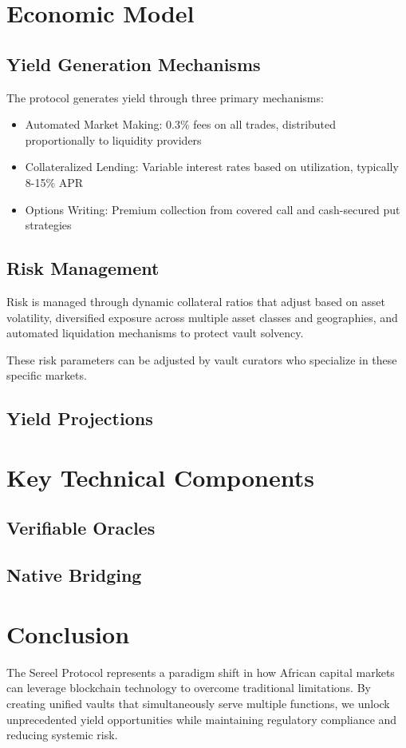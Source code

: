 \documentclass[12pt]{article}
\begin{document}
\section{Economic Model}

\subsection{Yield Generation Mechanisms}

The protocol generates yield through three primary mechanisms:

\begin{itemize}
  \item Automated Market Making: 0.3\% fees on all trades, distributed proportionally to liquidity providers
  \item Collateralized Lending: Variable interest rates based on utilization, typically 8-15\% APR
  \item Options Writing: Premium collection from covered call and cash-secured put strategies
\end{itemize}

\subsection{Risk Management}

Risk is managed through dynamic collateral ratios that adjust based on asset volatility, diversified exposure across multiple asset classes and geographies, and automated liquidation mechanisms to protect vault solvency.

These risk parameters can be adjusted by vault curators who specialize in these specific markets.

\subsection{Yield Projections}

\section{Key Technical Components}

\subsection{Verifiable Oracles}

\subsection{Native Bridging}

\section{Conclusion}

The Sereel Protocol represents a paradigm shift in how African capital markets can leverage blockchain technology to overcome traditional limitations. By creating unified vaults that simultaneously serve multiple functions, we unlock unprecedented yield opportunities while maintaining regulatory compliance and reducing systemic risk.
\end{document}
